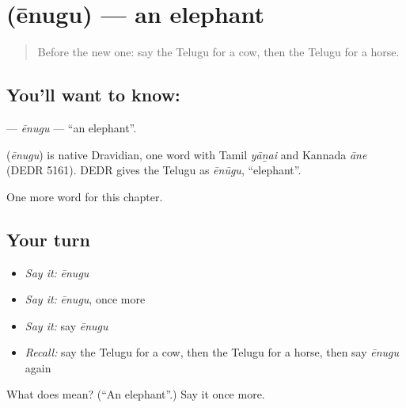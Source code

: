 \section[\texorpdfstring{\te{ఏనుగు} (ēnugu)}{ఏనుగు (ēnugu)}]{ (ēnugu) — an elephant}

\label{lesson:TE-C122-enugu}



\begin{quote}
Before the new one: say the Telugu for a cow, then the Telugu for a horse.
\end{quote}

\subsection*{You'll want to know: }
\textbf{} — \emph{ēnugu} — \textquotedblleft{}an elephant\textquotedblright{}.

\begin{cousinweb}
\textbf{} (\emph{ēnugu}) is native Dravidian, one word with Tamil \emph{yāṉai} and Kannada \emph{āne} (DEDR 5161). DEDR gives the Telugu as \emph{ēnūgu}, \textquotedblleft{}elephant\textquotedblright{}.
\end{cousinweb}

\begin{grammarlens}[title={What you've built}]
One more word for this chapter.
\end{grammarlens}

\subsection*{Your turn}
\begin{itemize}
\raggedright
  \item \emph{Say it:} \emph{ēnugu}
  \item \emph{Say it:} \emph{ēnugu}, once more
  \item \emph{Say it:} say \emph{ēnugu}
  \item \emph{Recall:} say the Telugu for a cow, then the Telugu for a horse, then say \emph{ēnugu} again
\end{itemize}

\begin{tcolorbox}[breakable,colback=teal!4,colframe=teal!35!black,title={Before you move on}]
What does  mean? (\textquotedblleft{}An elephant\textquotedblright{}.) Say it once more.
\end{tcolorbox}

